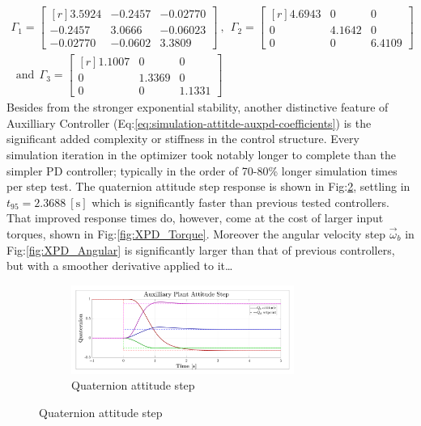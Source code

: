 \begin{multline}\label{eq:optimized-auxpd}
\Gamma_1=\begin{bmatrix*}[r]
3.5924 & -0.2457 & -0.02770\\
-0.2457 & 3.0666 & -0.06023\\
-0.02770 & -0.0602 & 3.3809
\end{bmatrix*}~,~~\Gamma_2=\begin{bmatrix*}[r]
4.6943 & 0 & 0\\
0 & 4.1642 & 0\\
0 & 0 & 6.4109
\end{bmatrix*}\\
~~\text{and}~~\Gamma_3=\begin{bmatrix*}[r]
1.1007 & 0 & 0\\
0 & 1.3369 & 0 \\
0 & 0 & 1.1331
\end{bmatrix*}
\end{multline}
Besides from the stronger exponential stability, another distinctive feature of Auxilliary Controller (Eq:\ref{eq:simulation-attitde-auxpd-coefficients}) is the significant added complexity or stiffness in the control structure. Every simulation iteration in the optimizer took notably longer to complete than the simpler PD controller; typically in the order of 70-80\% longer simulation times per step test. The quaternion attitude step response is shown in Fig:\ref{fig:XPD_Step}, settling in $t_{95}=2.3688~[\text{s}]$ which is significantly faster than previous tested controllers. That improved response times do, however, come at the cost of larger input torques, shown in Fig:\ref{fig:XPD_Torque}. Moreover the angular velocity step $\vec{\omega}_b$ in Fig:\ref{fig:XPD_Angular} is significantly larger than that of previous controllers, but with a smoother derivative applied to it\ldots
\par
\begin{figure}[hbtp]
\centering
\begin{subfigure}{\textwidth}
\centering
\includegraphics[width=0.8\textwidth]{graphs/XPD_Step}
\caption{Quaternion attitude step}
\label{fig:XPD_Step}
\end{subfigure}
\end{figure}

